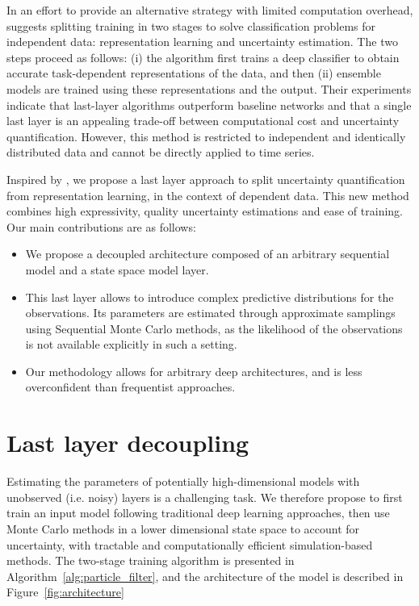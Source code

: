 \documentclass[conference]{IEEEtran}
\begin{document}
In an effort to provide an alternative strategy with limited computation overhead, \cite{Brosse2020OnLA} suggests splitting training in two stages to solve classification problems for independent data: representation learning and uncertainty estimation. The two steps proceed as follows: (i) the algorithm first trains a deep classifier to obtain accurate task-dependent representations of the data, and then (ii) ensemble models are trained using these representations and the output. Their experiments indicate that last-layer algorithms outperform baseline networks and that a single last layer is an appealing trade-off between computational cost and uncertainty quantification. However, this method is restricted to independent and identically distributed data and cannot be directly applied to time series.

Inspired by \cite{Brosse2020OnLA}, we propose a last layer approach to split uncertainty quantification from representation learning, in the context of dependent data.
This new method combines high expressivity, quality uncertainty estimations and ease of training.
Our main contributions are as follows:
\begin{itemize}
	\item We propose a decoupled architecture composed of an arbitrary sequential model and a state space model layer.
	\item This last layer allows to introduce complex predictive distributions for the observations.
	      Its parameters are estimated through approximate samplings using Sequential Monte Carlo methods, as the likelihood of the observations is not available explicitly in such a setting.
	\item Our methodology allows for arbitrary deep architectures, and is less overconfident than frequentist approaches.
\end{itemize}

\section{Last layer decoupling}
Estimating the parameters of potentially high-dimensional models with unobserved (i.e. noisy) layers is a challenging task.
We therefore propose to first train an input model following traditional deep learning approaches, then use Monte Carlo methods in a lower dimensional state space to account for uncertainty, with tractable and computationally efficient simulation-based methods.
The two-stage training algorithm is presented in Algorithm~\ref{alg:particle_filter}, and the architecture of the model is described in Figure~\ref{fig:architecture}
\end{document}
